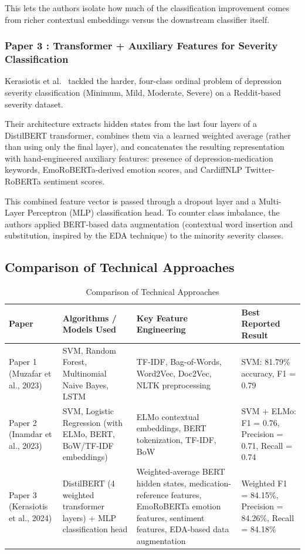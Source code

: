 \documentclass[a4paper,12pt]{article}
\begin{document}
This lets the authors isolate how much of the classification improvement comes from richer contextual embeddings versus the downstream classifier itself.

\subsubsection*{Paper 3 : Transformer + Auxiliary Features for Severity Classification}

Kerasiotis et al.~\cite{kerasiotis2024} tackled the harder, four-class ordinal problem of depression severity classification (Minimum, Mild, Moderate, Severe) on a Reddit-based severity dataset.

Their architecture extracts hidden states from the last four layers of a DistilBERT transformer, combines them via a learned weighted average (rather than using only the final layer), and concatenates the resulting representation with hand-engineered auxiliary features: presence of depression-medication keywords, EmoRoBERTa-derived emotion scores, and CardiffNLP Twitter-RoBERTa sentiment scores.

This combined feature vector is passed through a dropout layer and a Multi-Layer Perceptron (MLP) classification head. To counter class imbalance, the authors applied BERT-based data augmentation (contextual word insertion and substitution, inspired by the EDA technique) to the minority severity classes.

\subsection{Comparison of Technical Approaches}

\begin{table}[htbp]
\centering
\caption{Comparison of Technical Approaches}
\label{tab:technical_comparison}
\renewcommand{\arraystretch}{1.3}
\begin{tabular}{|p{2.2cm}|p{3.5cm}|p{3.5cm}|p{3cm}|}
\hline
\textbf{Paper} & \textbf{Algorithms / Models Used} & \textbf{Key Feature Engineering} & \textbf{Best Reported Result} \\
\hline

Paper 1 (Muzafar et al., 2023) &
SVM, Random Forest, Multinomial Naive Bayes, LSTM &
TF-IDF, Bag-of-Words, Word2Vec, Doc2Vec, NLTK preprocessing &
SVM: 81.79\% accuracy, F1 = 0.79 \\
\hline

Paper 2 (Inamdar et al., 2023) &
SVM, Logistic Regression (with ELMo, BERT, BoW/TF-IDF embeddings) &
ELMo contextual embeddings, BERT tokenization, TF-IDF, BoW &
SVM + ELMo: F1 = 0.76, Precision = 0.71, Recall = 0.74 \\
\hline

Paper 3 (Kerasiotis et al., 2024) &
DistilBERT (4 weighted transformer layers) + MLP classification head &
Weighted-average BERT hidden states, medication-reference features, EmoRoBERTa emotion features, sentiment features, EDA-based data augmentation &
Weighted F1 = 84.15\%, Precision = 84.26\%, Recall = 84.18\% \\
\hline

\end{tabular}
\end{table}
\end{document}

